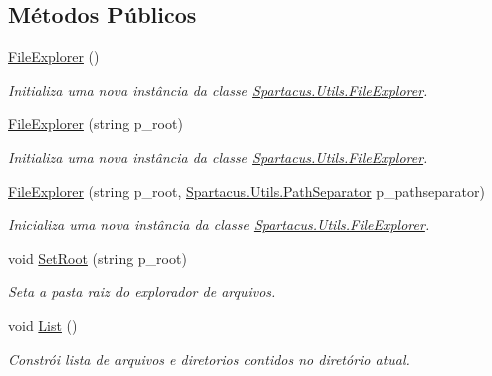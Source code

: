 \subsection*{Métodos Públicos}
\begin{DoxyCompactItemize}
\item 
\hyperlink{classSpartacus_1_1Utils_1_1FileExplorer_a133727a338ccd4e44e9a32c0f89d9852}{File\+Explorer} ()
\begin{DoxyCompactList}\small\item\em Initializa uma nova instância da classe \hyperlink{classSpartacus_1_1Utils_1_1FileExplorer}{Spartacus.\+Utils.\+File\+Explorer}. \end{DoxyCompactList}\item 
\hyperlink{classSpartacus_1_1Utils_1_1FileExplorer_a37f733923b430db407d1459746d7fac7}{File\+Explorer} (string p\+\_\+root)
\begin{DoxyCompactList}\small\item\em Initializa uma nova instância da classe \hyperlink{classSpartacus_1_1Utils_1_1FileExplorer}{Spartacus.\+Utils.\+File\+Explorer}. \end{DoxyCompactList}\item 
\hyperlink{classSpartacus_1_1Utils_1_1FileExplorer_ac9adca2bd6d8767c21aa90a95efb087a}{File\+Explorer} (string p\+\_\+root, \hyperlink{namespaceSpartacus_1_1Utils_a9ee24558a33d60b42674bae3eed2a094}{Spartacus.\+Utils.\+Path\+Separator} p\+\_\+pathseparator)
\begin{DoxyCompactList}\small\item\em Inicializa uma nova instância da classe \hyperlink{classSpartacus_1_1Utils_1_1FileExplorer}{Spartacus.\+Utils.\+File\+Explorer}. \end{DoxyCompactList}\item 
void \hyperlink{classSpartacus_1_1Utils_1_1FileExplorer_a0b21899a7ac47d7a84d0558df390f388}{Set\+Root} (string p\+\_\+root)
\begin{DoxyCompactList}\small\item\em Seta a pasta raiz do explorador de arquivos. \end{DoxyCompactList}\item 
void \hyperlink{classSpartacus_1_1Utils_1_1FileExplorer_afc668f70066735934e76ed84c42b8d7e}{List} ()
\begin{DoxyCompactList}\small\item\em Constrói lista de arquivos e diretorios contidos no diretório atual. \end{DoxyCompactList}\item 

\end{DoxyCompactItemize}
